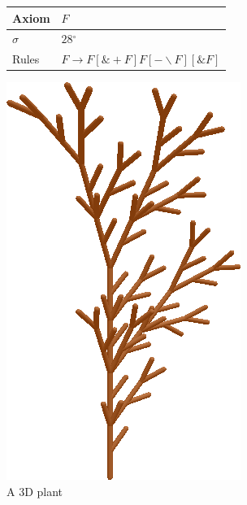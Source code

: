 \documentclass[11pt,a4paper]{article}
\newcommand{\degree}{\ensuremath{^\circ}}
\begin{document}
\begin{figure}[htb]
  \centering
  \begin{minipage}[c]{0.65\textwidth}
    \centering
    \begin{tabular}{l l}
Axiom & $F$ \\ \hline
$\sigma$ & $28$\degree \\ \hline
Rules & $F \rightarrow F[\&+F]F[-\backslash F][\&F]$
	\end{tabular}
  \end{minipage}
  \begin{minipage}[c]{0.25\textwidth}
    \includegraphics[width=\textwidth]{3dtree.png}
  \end{minipage}
  \caption{A 3D plant}
  \label{fig:3dtree}
\end{figure}
\end{document}
